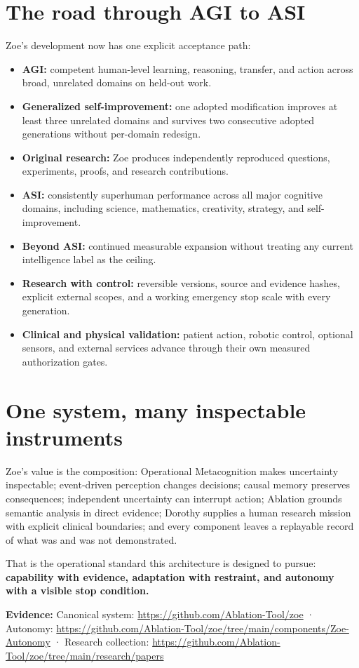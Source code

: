\documentclass[11pt]{article}
\newcommand{\evidence}[1]{\par\smallskip\small\color{ZoeGray}\textbf{Evidence:} #1\normalsize\par\smallskip}
\begin{document}
\clearpage
\section{The road through AGI to ASI}

Zoe's development now has one explicit acceptance path:

\begin{itemize}
  \item \textbf{AGI:} competent human-level learning, reasoning, transfer, and action across broad, unrelated domains on held-out work.
  \item \textbf{Generalized self-improvement:} one adopted modification improves at least three unrelated domains and survives two consecutive adopted generations without per-domain redesign.
  \item \textbf{Original research:} Zoe produces independently reproduced questions, experiments, proofs, and research contributions.
  \item \textbf{ASI:} consistently superhuman performance across all major cognitive domains, including science, mathematics, creativity, strategy, and self-improvement.
  \item \textbf{Beyond ASI:} continued measurable expansion without treating any current intelligence label as the ceiling.
  \item \textbf{Research with control:} reversible versions, source and evidence hashes, explicit external scopes, and a working emergency stop scale with every generation.
  \item \textbf{Clinical and physical validation:} patient action, robotic control, optional sensors, and external services advance through their own measured authorization gates.
\end{itemize}

\section{One system, many inspectable instruments}

Zoe's value is the composition: Operational Metacognition makes uncertainty inspectable; event-driven perception changes decisions; causal memory preserves consequences; independent uncertainty can interrupt action; Ablation grounds semantic analysis in direct evidence; Dorothy supplies a human research mission with explicit clinical boundaries; and every component leaves a replayable record of what was and was not demonstrated.

That is the operational standard this architecture is designed to pursue: \textbf{capability with evidence, adaptation with restraint, and autonomy with a visible stop condition.}

\evidence{Canonical system: \url{https://github.com/Ablation-Tool/zoe} · Autonomy: \url{https://github.com/Ablation-Tool/zoe/tree/main/components/Zoe-Autonomy} · Research collection: \url{https://github.com/Ablation-Tool/zoe/tree/main/research/papers}}
\end{document}

